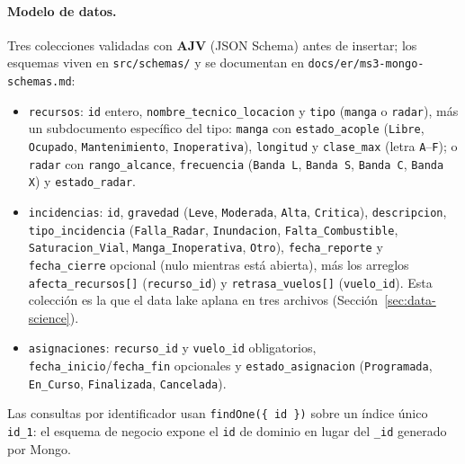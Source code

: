 \paragraph{Modelo de datos.}
Tres colecciones validadas con \textbf{AJV} (JSON Schema) antes de
insertar; los esquemas viven en \texttt{src/schemas/} y se documentan en
\texttt{docs/er/ms3-mongo-schemas.md}:
\begin{itemize}
  \item \texttt{recursos}: \texttt{id} entero, \texttt{nombre\_tecnico\_locacion}
    y \texttt{tipo} (\texttt{manga} o \texttt{radar}), más un
    subdocumento específico del tipo: \texttt{manga} con
    \texttt{estado\_acople} (\texttt{Libre}, \texttt{Ocupado},
    \texttt{Mantenimiento}, \texttt{Inoperativa}), \texttt{longitud} y
    \texttt{clase\_max} (letra \texttt{A}--\texttt{F}); o \texttt{radar}
    con \texttt{rango\_alcance}, \texttt{frecuencia} (\texttt{Banda L},
    \texttt{Banda S}, \texttt{Banda C}, \texttt{Banda X}) y
    \texttt{estado\_radar}.
  \item \texttt{incidencias}: \texttt{id}, \texttt{gravedad}
    (\texttt{Leve}, \texttt{Moderada}, \texttt{Alta}, \texttt{Critica}),
    \texttt{descripcion}, \texttt{tipo\_incidencia}
    (\texttt{Falla\_Radar}, \texttt{Inundacion},
    \texttt{Falta\_Combustible}, \texttt{Saturacion\_Vial},
    \texttt{Manga\_Inoperativa}, \texttt{Otro}), \texttt{fecha\_reporte}
    y \texttt{fecha\_cierre} opcional (nulo mientras está abierta), más
    los arreglos \texttt{afecta\_recursos[]} (\texttt{recurso\_id}) y
    \texttt{retrasa\_vuelos[]} (\texttt{vuelo\_id}). Esta colección es
    la que el data lake aplana en tres archivos (Sección~\ref{sec:data-science}).
  \item \texttt{asignaciones}: \texttt{recurso\_id} y \texttt{vuelo\_id}
    obligatorios, \texttt{fecha\_inicio}/\texttt{fecha\_fin} opcionales
    y \texttt{estado\_asignacion} (\texttt{Programada}, \texttt{En\_Curso},
    \texttt{Finalizada}, \texttt{Cancelada}).
\end{itemize}
Las consultas por identificador usan \texttt{findOne(\{ id \})} sobre un
índice único \texttt{id\_1}: el esquema de negocio expone el
\texttt{id} de dominio en lugar del \texttt{\_id} generado por Mongo.

